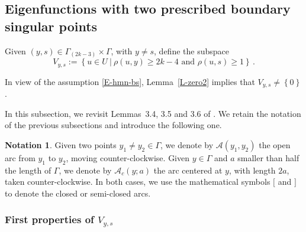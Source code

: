 \documentclass[12pt,a4paper]{amsart}
\theoremstyle{plain} %
\theoremstyle{definition}
\newtheorem{notation}[theorem]{Notation}
\numberwithin{equation}{section}
\numberwithin{figure}{section}
\numberwithin{table}{section}
\newcommand{\cA}{\mathcal{A}}
\newcommand{\set}[1]{\left\lbrace #1 \right\rbrace}
\begin{document}
\FloatBarrier

%
\subsection{Eigenfunctions with two prescribed boundary singular points}\label{SS-hmn32b}  Given $(y,s) \in \Gamma_{(2k -3)} \times \Gamma $, with $ y \neq s$, define the subspace
%
\begin{equation}\label{E-L34-2}
V_{y,s} := \set{u \in U ~|~ \rho(u,y) \ge 2k-4 \text{~and~} \rho(u,s) \ge 1}\,.
\end{equation}

 In view of the assumption \eqref{E-hmn-bs}, Lemma~\ref{L-zero2} implies that $V_{y,s} \neq \set{0}$. \smallskip

In this subsection, we revisit Lemmas~3.4, 3.5 and 3.6 of \cite[pp.~1180-1183]{HoMN1999}. We retain the notation of the previous subsections and introduce the following one.

\begin{notation}\label{N-L34-2}
Given two points $y_1 \neq y_2 \in \Gamma $, we denote by $\cA(y_1,y_2)$ the open arc from $y_1$ to $y_2$, moving counter-clockwise. Given $y \in \Gamma $ and $a$ smaller than half the length of $\Gamma $, we denote by $\cA_c(y;a)$ the arc centered at $y$, with length $2a$, taken counter-clockwise. In both cases, we use  the mathematical  symbols  $[$ and $]$ to denote the closed or semi-closed arcs.
\end{notation}%

\subsubsection{First properties of $V_{y,s}$}\label{SSS-hmn32ba}
\end{document}
